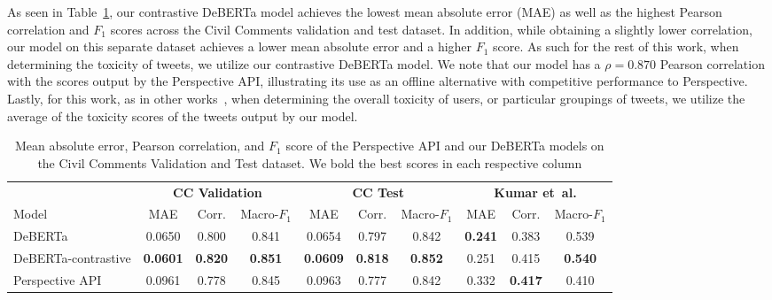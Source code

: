As seen in Table~\ref{tab:benchmark-toxicity}, our contrastive DeBERTa model achieves the lowest mean absolute error (MAE) as well as the highest Pearson correlation and $F_1$ scores across the Civil Comments validation and test dataset. In addition, while obtaining a slightly lower correlation, our model on this separate dataset achieves a lower mean absolute error and a higher $F_1$ score. As such for the rest of this work, when determining the toxicity of tweets, we utilize our contrastive DeBERTa model. We note that our model has a $\rho= 0.870$ Pearson correlation with the scores output by the Perspective API, illustrating its use as an offline alternative with competitive performance to Perspective. Lastly, for this work, as in other works~\cite{hanley2023sub, rajadesingan2020quick}, when determining the overall toxicity of users, or particular groupings of tweets, we utilize the average of the toxicity scores of the tweets output by our model. 
 

\begin{table}
\centering
\fontsize{8.4pt}{6}
\selectfont
\begin{tabular}{l|ccc|ccc|ccc}
\toprule
& \multicolumn{3}{c|}{\textbf{CC Validation}} & \multicolumn{3}{c|}{\textbf{CC Test }} & \multicolumn{3}{c}{\textbf{Kumar {et~al.} }} \\

Model & MAE & Corr. &Macro-$F_1$ & MAE & Corr. &Macro-$F_1$&  MAE & Corr. &Macro-$F_1$\\ \midrule
DeBERTa & 0.0650 &0.800 &0.841 & 0.0654& 0.797 &0.842 & \textbf{0.241} & 0.383 & 0.539  \\
DeBERTa-contrastive & \textbf{0.0601} &\textbf{0.820} &\textbf{0.851} & \textbf{0.0609}& \textbf{0.818}&\textbf{0.852} & {0.251} & 0.415 & \textbf{0.540}  \\
Perspective API & 0.0961& 0.778& 0.845& 0.0963& 0.777 & 0.842 & 0.332 & \textbf{0.417} & 0.410 \\
\bottomrule
\end{tabular}
\vspace{3pt}
\caption{\label{tab:benchmark-toxicity} Mean absolute error, Pearson correlation, and $F_1$ score of the Perspective API and our DeBERTa models on the Civil Comments Validation and Test dataset. We bold the best scores in each respective column  }
\vspace{-10pt}
\end{table}




